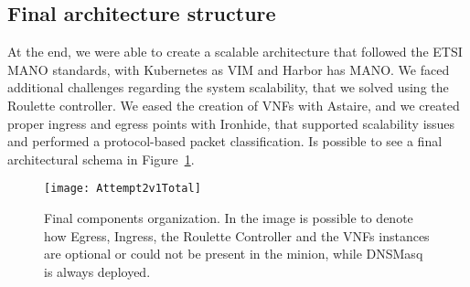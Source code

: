\subsection{Final architecture structure}
At the end, we were able to create a scalable architecture that followed the
ETSI MANO standards, with Kubernetes as VIM and Harbor has MANO. We faced
additional challenges regarding the system scalability, that we solved using the
Roulette controller. We eased the creation of VNFs with Astaire, and we created
proper ingress and egress points with Ironhide, that supported scalability
issues and performed a protocol-based packet classification. Is possible to see
a final architectural schema in
Figure~\ref{chap:archimpl:sec:secondattempt:img:attempt2v1total}.

\begin{figure}[t]
  \centering
  \texttt{[image: Attempt2v1Total]}
  \caption[Final components organization]{Final components organization. In the
    image is possible to denote how Egress, Ingress, the Roulette Controller and
    the VNFs instances are optional or could not be present in the minion, while
    DNSMasq is always deployed.}
  \label{chap:archimpl:sec:secondattempt:img:attempt2v1total}
\end{figure}
